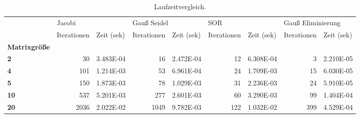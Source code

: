 \begin{table}[h!]
\centering
\caption{Laufzeitvergleich.}
\label{laufzeit}
\begin{tabular}{lrlrlrlrl}
\toprule
{} & \multicolumn{2}{l}{Jacobi} & \multicolumn{2}{l}{Gauß Seidel} & \multicolumn{2}{l}{SOR} & \multicolumn{2}{l}{Gauß Eliminierung} \\
{} & Iterationen & Zeit (sek) & Iterationen & Zeit (sek) & Iterationen & Zeit (sek) &       Iterationen & Zeit (sek) \\
\textbf{Matrixgröße} &             &            &             &            &             &            &                   &            \\
\midrule
\textbf{2          } &          30 &  3.483E-04 &          16 &  2.472E-04 &          12 &  6.308E-04 &                 3 &  2.210E-05 \\
\textbf{4          } &         101 &  1.214E-03 &          53 &  6.961E-04 &          24 &  1.709E-03 &                15 &  6.030E-05 \\
\textbf{5          } &         150 &  1.873E-03 &          78 &  1.029E-03 &          31 &  2.236E-03 &                24 &  5.910E-05 \\
\textbf{10         } &         537 &  5.201E-03 &         277 &  2.601E-03 &          60 &  3.290E-03 &                99 &  1.404E-04 \\
\textbf{20         } &        2036 &  2.022E-02 &        1049 &  9.782E-03 &         122 &  1.032E-02 &               399 &  4.529E-04 \\
\bottomrule
\end{tabular}
\end{table}
